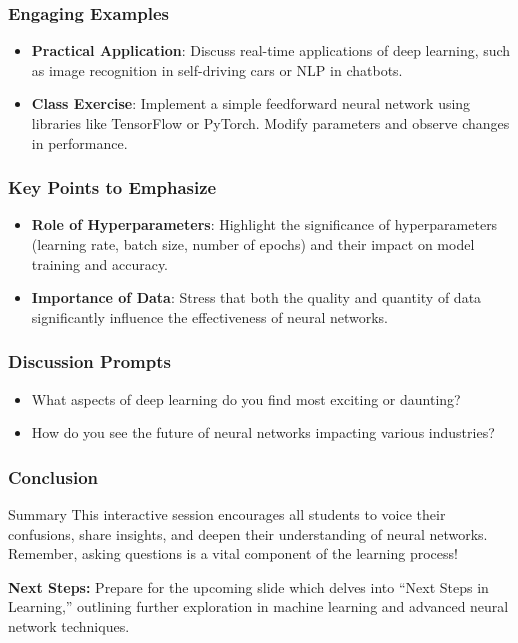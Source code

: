 \documentclass[aspectratio=169]{beamer}
\begin{document}
\begin{frame}[fragile]
    \frametitle{Engaging Examples}
    \begin{itemize}
        \item \textbf{Practical Application}: Discuss real-time applications of deep learning, such as image recognition in self-driving cars or NLP in chatbots. 
        \item \textbf{Class Exercise}: Implement a simple feedforward neural network using libraries like TensorFlow or PyTorch. Modify parameters and observe changes in performance.
    \end{itemize}
\end{frame}

\begin{frame}[fragile]
    \frametitle{Key Points to Emphasize}
    \begin{itemize}
        \item \textbf{Role of Hyperparameters}: Highlight the significance of hyperparameters (learning rate, batch size, number of epochs) and their impact on model training and accuracy.
        \item \textbf{Importance of Data}: Stress that both the quality and quantity of data significantly influence the effectiveness of neural networks.
    \end{itemize}
\end{frame}

\begin{frame}[fragile]
    \frametitle{Discussion Prompts}
    \begin{itemize}
        \item What aspects of deep learning do you find most exciting or daunting?
        \item How do you see the future of neural networks impacting various industries?
    \end{itemize}
\end{frame}

\begin{frame}[fragile]
    \frametitle{Conclusion}
    \begin{block}{Summary}
        This interactive session encourages all students to voice their confusions, share insights, and deepen their understanding of neural networks. Remember, asking questions is a vital component of the learning process!
    \end{block}
    \vspace{0.5cm}
    \textbf{Next Steps:} Prepare for the upcoming slide which delves into “Next Steps in Learning,” outlining further exploration in machine learning and advanced neural network techniques.
\end{frame}
\end{document}
